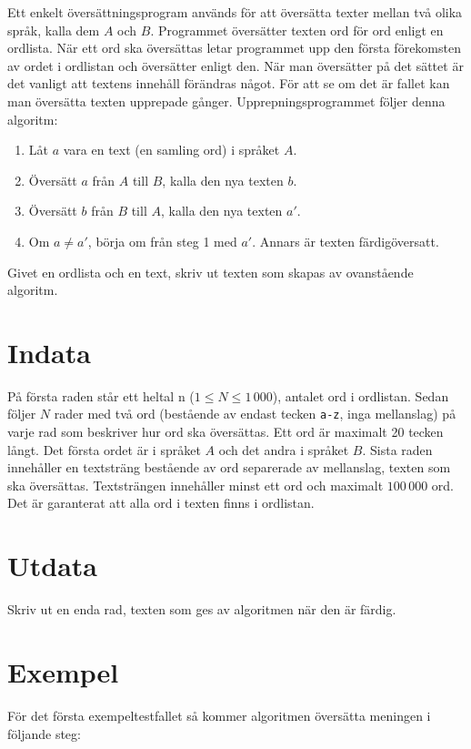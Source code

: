 Ett enkelt översättningsprogram används för att översätta texter mellan två
olika språk, kalla dem $A$ och $B$. Programmet översätter texten ord för ord enligt
en ordlista. När ett ord ska översättas letar programmet upp den första
förekomsten av ordet i ordlistan och översätter enligt den. När man översätter
på det sättet är det vanligt att textens innehåll förändras något. För att se
om det är fallet kan man översätta texten upprepade gånger. Upprepningsprogrammet
följer denna algoritm:

\begin{enumerate}
    \item Låt $a$ vara en text (en samling ord) i språket $A$.
    \item Översätt $a$ från $A$ till $B$, kalla den nya texten $b$.
    \item Översätt $b$ från $B$ till $A$, kalla den nya texten $a'$.
    \item Om $a \not = a'$, börja om från steg 1 med $a'$. Annars är texten färdigöversatt.
\end{enumerate}

Givet en ordlista och en text, skriv ut texten som skapas av ovanstående algoritm.

\section*{Indata}
På första raden står ett heltal n ($1 \leq N \leq 1\,000$), antalet ord i ordlistan.
Sedan följer $N$ rader med två ord (bestående av endast tecken \texttt{a-z},
inga mellanslag) på varje rad som beskriver hur ord ska översättas. Ett ord är maximalt 20 tecken långt.
Det första ordet är i språket $A$ och det andra i språket $B$. Sista raden innehåller en textsträng
bestående av ord separerade av mellanslag, texten som ska översättas. Textsträngen innehåller minst ett ord och
maximalt $100\,000$ ord. Det är garanterat
att alla ord i texten finns i ordlistan.

\section*{Utdata}
Skriv ut en enda rad, texten som ges av algoritmen när den är färdig.

\section*{Exempel}
För det första exempeltestfallet så kommer algoritmen översätta meningen i följande steg:

